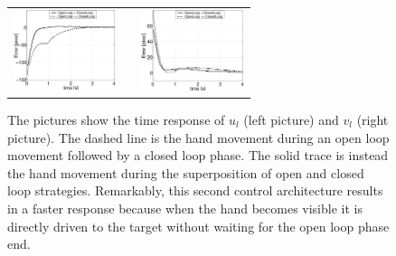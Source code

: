   \begin{figure}
  \begin{center}
	\begin{tabular}{ccc}
	  \parbox{30mm}{\includegraphics[width=30mm]{Figure/OpenVSClosedLoopTimeResponse1.eps}}  & \hspace{.1cm} &
	  \parbox{30mm}{\includegraphics[width=30mm]{Figure/OpenVSClosedLoopTimeResponse2.eps}}
  \end{tabular}
\end{center}
\caption{The pictures show the time response of $u_l$ (left picture) and $v_l$ (right picture). The dashed line is the hand movement
during an open loop movement followed by a closed loop phase. The solid trace is instead the hand movement during 
the superposition of open and closed loop strategies. Remarkably, this second control architecture results in a faster response because when the hand becomes visible it is directly driven to the target without waiting for the open loop phase end.}\label{Fig:TimeResponseOpenVSClosedLoop}
  \end{figure}

